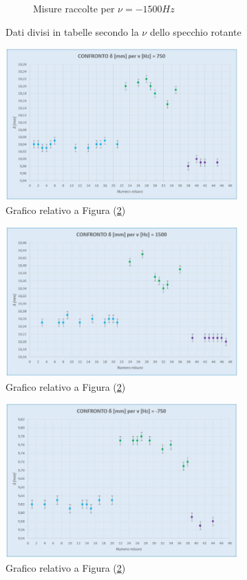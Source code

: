 \documentclass{article}
\begin{document}
\begin{figure}[h]
\begin{subfigure}[h]{0.2\linewidth}
        \caption{Misure raccolte per $\nu=-1500Hz$}
        \label{Tab_-1500}
    \end{subfigure}
        \caption{Dati divisi in tabelle secondo la $\nu$ dello specchio rotante}
        \label{Tabs}
\end{figure}

\begin{figure}[h]
    \centering
    \includegraphics[width=0.8\textwidth]{Coerenza_G1.JPG}
    \caption{Grafico relativo a Figura (\ref{Tabs})}
    \label{Graf_750}
\end{figure}

\begin{figure}[h]
    \centering
    \includegraphics[width=0.8\textwidth]{Coerenza_G2.JPG}
    \caption{Grafico relativo a Figura (\ref{Tabs})}
    \label{Graf_1500}
\end{figure}

\begin{figure}[h]
    \centering
    \includegraphics[width=0.8\textwidth]{Coerenza_G3.JPG}
    \caption{Grafico relativo a Figura (\ref{Tabs})}
    \label{Graf_-750}
\end{figure}
\end{document}
